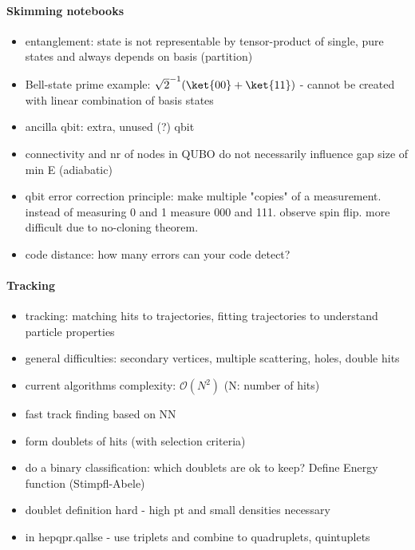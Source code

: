 \paragraph{Skimming notebooks}
\begin{itemize}
  \item entanglement: state is not representable by tensor-product of single, pure states and always depends on basis (partition)
  \item Bell-state prime example: $\sqrt{2}^{-1}(\ket{00}+\ket{11})$ - cannot be created with linear combination of basis states
  \item ancilla qbit: extra, unused (?) qbit
  \item connectivity and nr of nodes in QUBO do not necessarily influence gap
	size of min E (adiabatic)
  \item qbit error correction principle: make multiple "copies" of a
	measurement. instead of measuring 0 and 1 measure 000 and 111. observe spin
	flip. more difficult due to no-cloning theorem.
  \item code distance: how many errors can your code detect?
\end{itemize}

\paragraph{Tracking}
\begin{itemize}
  \item tracking: matching hits to trajectories, fitting trajectories to understand particle properties
  \item general difficulties: secondary vertices, multiple scattering, holes, double hits
  \item current algorithms complexity: $\mathcal{O}(N^2)$ (N: number of hits)
\end{itemize}
\begin{itemize}
  \item fast track finding based on NN
  \item form doublets of hits (with selection criteria)
  \item do a binary classification: which doublets are ok to keep? Define Energy function (Stimpfl-Abele)
  \item doublet definition hard - high pt and small densities necessary
  \item in hepqpr.qallse - use triplets and combine to quadruplets, quintuplets
\end{itemize}

